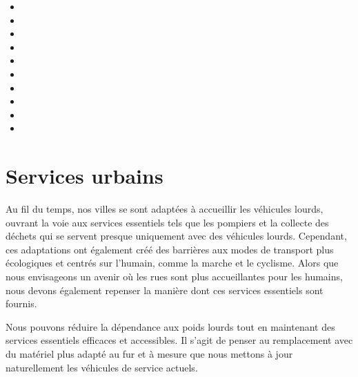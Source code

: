 
\begin{itemize}
\item {}
\item {}
\item {}
\item {}
\item {}
\item {}
\item {}
\item {}
\item {}
\item {}
\end{itemize}


\section{Services urbains}

Au fil du temps, nos villes se sont adaptées à accueillir les
véhicules lourds, ouvrant la voie aux services essentiels tels que les
pompiers et la collecte des déchets qui se servent presque uniquement
avec des véhicules lourds. Cependant, ces adaptations ont également
créé des barrières aux modes de transport plus écologiques et centrés
sur l'humain, comme la marche et le cyclisme. Alors que nous
envisageons un avenir où les rues sont plus accueillantes pour les
humains, nous devons également repenser la manière dont ces services
essentiels sont fournis.

Nous pouvons réduire la dépendance aux poids lourds tout en maintenant
des services essentiels efficaces et accessibles.  Il s'agit de penser
au remplacement avec du matériel plus adapté au fur et à mesure que
nous mettons à jour naturellement les véhicules de service actuels.

